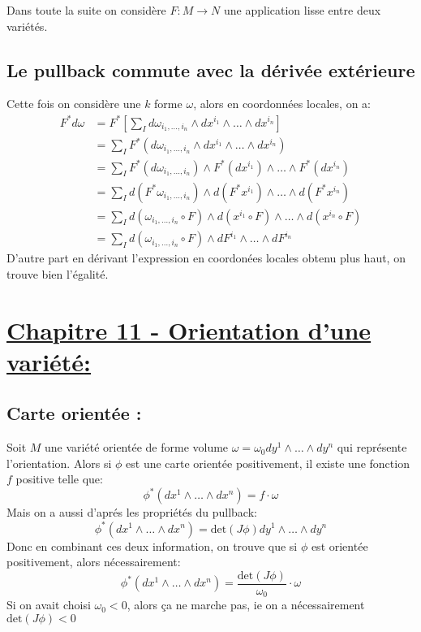   Dans toute la suite on considère $F : M \longrightarrow N$ une application lisse entre deux variétés.
   \subsection*{Le pullback commute avec la dérivée extérieure}
      Cette fois on considère une $k$ forme $\omega$, alors en coordonnées locales, on a:
      \begin{align*}
         F^*d\omega &= F^*\left[\sum_{I} d\omega_{i_1, \ldots, i_n} \wedge dx^{i_1} \wedge \ldots \wedge dx^{i_n}\right]\\
         &= \sum_{I} F^*(d\omega_{i_1, \ldots, i_n} \wedge dx^{i_1}  \wedge \ldots \wedge dx^{i_n})\\
         &= \sum_{I} F^*(d\omega_{i_1, \ldots, i_n}) \wedge F^*(dx^{i_1})  \wedge \ldots \wedge F^*(dx^{i_n})\\
         &= \sum_{I} d(F^*\omega_{i_1, \ldots, i_n}) \wedge d(F^*x^{i_1})  \wedge \ldots \wedge d(F^*x^{i_n})\\
         &= \sum_{I} d(\omega_{i_1, \ldots, i_n} \circ F) \wedge d(x^{i_1} \circ F)  \wedge \ldots \wedge d(x^{i_n} \circ F)\\
         &= \sum_{I} d(\omega_{i_1, \ldots, i_n} \circ F) \wedge dF^{i_1}  \wedge \ldots \wedge  dF^{i_n}
      \end{align*}
      D'autre part en dérivant l'expression en coordonées locales obtenu plus haut, on trouve bien l'égalité.

\pagebreak
\section*{\uline{Chapitre 11 - Orientation d'une variété{:}}}
   \subsection*{Carte orientée {:}}
   Soit \( M \) une variété orientée de forme volume \( \omega = \omega_0 dy^1 \wedge \ldots \wedge dy^n \) qui représente l'orientation. Alors si \( \phi \) est une carte orientée positivement, il existe une fonction \( f \) positive telle que:
   \[ 
      \phi^*(dx^1 \wedge \ldots \wedge dx^n) = f \cdot \omega
   \]
   Mais on a aussi d'aprés les propriétés du pullback:
   \[ 
      \phi^*(dx^1 \wedge \ldots \wedge dx^n) = \text{det}(J\phi) dy^1 \wedge \ldots \wedge dy^n
   \]
   Donc en combinant ces deux information, on trouve que si \( \phi \) est orientée positivement, alors nécessairement:
   \[ 
      \phi^*(dx^1 \wedge \ldots \wedge dx^n) = \frac{\text{det}(J\phi)}{\omega_0} \cdot \omega
   \]
   Si on avait choisi \( \omega_0 < 0\), alors {\color{red}ça ne marche pas}, ie on a nécessairement \( \text{det}(J\phi) <0 \)
